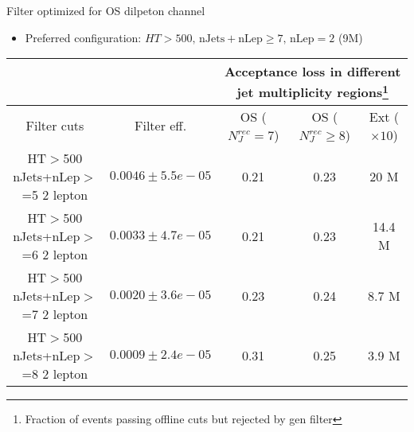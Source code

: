 \documentclass[xcolor=table]{beamer}
\begin{document}
\begin{frame}{Filter optimized for OS dilpeton channel}
\begin{itemize}
\item{\footnotesize  Preferred configuration: $HT>500,\, \mathrm{nJets+nLep}\geq7,\,  \mathrm{nLep}=2$ (9M)}
\end{itemize}
\begin{center}
{\tiny \begin{tabular}{|c|c|c|c|c|}
            \cline{1-5}
             & & \multicolumn{3}{|c|}{Acceptance loss in different jet multiplicity regions\footnote{Fraction of events passing offline cuts but rejected by gen filter}}\\
            \cline{1-5}
\hline Filter cuts 	& Filter eff. 	& OS  ($N_J^{rec}=7$)& OS ($N_J^{rec}\geq8$)&  Ext ($\times 10$) \\
\hline \thead{HT$>$500 \\  nJets+nLep$>$=5 \\  $2$ lepton} & $0.0046 \pm 5.5e-05$  & 0.21 & 0.23 & 20 M\\ 
\hline \thead{HT$>$500 \\  nJets+nLep$>$=6 \\  $2$ lepton} & $0.0033 \pm 4.7e-05$  & 0.21 & 0.23 & 14.4 M\\
\hline \rowcolor{lightgray} \thead{HT$>$500 \\  nJets+nLep$>$=7 \\  $2$ lepton} & $0.0020 \pm 3.6e-05$  & 0.23 & 0.24 & 8.7 M\\ 
\hline \thead{HT$>$500 \\  nJets+nLep$>$=8 \\  $2$ lepton} & $0.0009 \pm 2.4e-05$  & 0.31 & 0.25 & 3.9 M\\
\hline 
\end{tabular} }
\end{center}

\end{frame}
\end{document}
